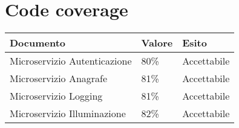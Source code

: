 \section{Code coverage}

\begin{center}
    \begin{xltabular}{\linewidth}{|l|l|l|}
    \hline
    \textbf{Documento} & \textbf{Valore} & \textbf{Esito} \\
    \hline
     Microservizio Autenticazione & 80\% & Accettabile \\
     Microservizio Anagrafe & 81\% & Accettabile \\
     Microservizio Logging & 81\% & Accettabile \\
     Microservizio Illuminazione & 82\% & Accettabile \\
    \hline

    \end{xltabular}
\end{center}